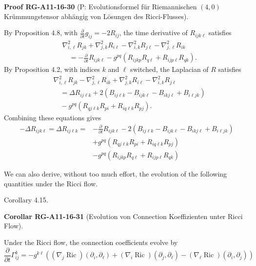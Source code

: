 \documentclass[10pt, letterpaper]{article}
\newcommand{\CustomHeading}[3]{%
  \par\medskip\noindent%
  \textbf{#1 #2} \textnormal{(#3)}.\enskip%
}
\newenvironment{KORO}[2]{\begin{unitbox}\CustomHeading{Corollar}{#1}{#2}}{\end{unitbox}}
\newenvironment{PROOF}[2]{\begin{unitbox}\CustomHeading{Proof}{#1}{#2}}{\end{unitbox}}
\begin{document}
\begin{PROOF}{RG-A11-16-30}{P: Evolutionsformel für Riemannischen $(4,0)$ Krümmungstensor abhängig von Lösungen des Ricci-Flusses}
By Proposition 4.8, with $\frac{\partial}{\partial t} g_{i j}=-2 R_{i j}$, the time derivative of $R_{i j k \ell}$ satisfies
$$
\begin{aligned}
& \nabla_{i, \ell}^{2} R_{j k}+\nabla_{j, k}^{2} R_{i \ell}-\nabla_{i, k}^{2} R_{j \ell}-\nabla_{j, \ell}^{2} R_{i k} \\
& \quad=-\frac{\partial}{\partial t} R_{i j k \ell}-g^{p q}\left(R_{i j k p} R_{q \ell}+R_{i j p \ell} R_{q k}\right) .
\end{aligned}
$$
By Proposition 4.2, with indices $k$ and $\ell$ switched, the Laplacian of $R$ satisfies
$$
\begin{aligned}
& \nabla_{i, \ell}^{2} R_{j k}-\nabla_{j, \ell}^{2} R_{i k}+\nabla_{j, k}^{2} R_{i \ell}-\nabla_{i, k}^{2} R_{j \ell} \\
& \quad=\Delta R_{i j \ell k}+2\left(B_{i j \ell k}-B_{i j k \ell}-B_{i k j \ell}+B_{i \ell j k}\right) \\
& \quad-g^{p q}\left(R_{q j \ell k} R_{p i}+R_{i q \ell k} R_{p j}\right) .
\end{aligned}
$$
Combining these equations gives
$$
\begin{aligned}
-\Delta R_{i j k \ell}=\Delta R_{i j \ell k}= & -\frac{\partial}{\partial t} R_{i j k \ell}-2\left(B_{i j \ell k}-B_{i j k \ell}-B_{i k j \ell}+B_{i \ell j k}\right) \\
& +g^{p q}\left(R_{q j \ell k} R_{p i}+R_{i q \ell k} R_{p j}\right) \\
& -g^{p q}\left(R_{i j k p} R_{q \ell}+R_{i j p \ell} R_{q k}\right)
\end{aligned}
$$
\end{PROOF}




We can also derive, without too much effort, the evolution of the following quantities under the Ricci flow.



Corollary 4.15. 


\begin{KORO}{RG-A11-16-31}{Evolution von Connection Koeffizienten unter Ricci Flow}
Under the Ricci flow, the connection coefficients evolve by
$$
\frac{\partial}{\partial t} \Gamma_{i j}^{k}=-g^{k \ell}\left(\left(\nabla_{j} \operatorname{Ric}\right)\left(\partial_{i}, \partial_{\ell}\right)+\left(\nabla_{i} \operatorname{Ric}\right)\left(\partial_{j}, \partial_{\ell}\right)-\left(\nabla_{\ell} \operatorname{Ric}\right)\left(\partial_{i}, \partial_{j}\right)\right)
$$
\end{KORO}
\end{document}
